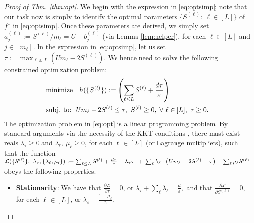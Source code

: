 \begin{proof}[Proof of Thm. \ref{thm:opt}]
	We begin with the expression in \eqref{eq:optsimp}; note that our task now is simply to identify the optimal parameters $\{S^{(\ell)}:\ \ell\in [L]\}$ of $f^\star$ in \eqref{eq:optsimp}. Once these parameters are derived, we simply set $a_j^{(\ell)}:= S^{(\ell)}/m_\ell = U-b_j^{(\ell)}$ (via Lemma \ref{lem:helper}), for each $\ell\in [L]$ and $j\in [m_\ell]$. In the expression in \eqref{eq:optsimp}, let us set $\tau:= \max_{\ell\leq L} \left(Um_\ell - 2S^{(\ell)}\right)$. We hence need to solve the following constrained optimization problem:
	\begin{align}
		&{\text{minimize}}\quad h(\{S^{(\ell)}\}):= \left(\sum_{\ell\leq L} S^{(\ell)}+\frac{d\tau}{\varepsilon}\right)\notag\\
		&\text{subj. to:}\ \  Um_\ell-2S^{(\ell)}\leq \tau,\ S^{(\ell)}\geq 0,\ \forall\ \ell\in [L],\ \tau\geq 0.\label{eq:opt}
	\end{align}
The optimization problem in \eqref{eq:opt} is a linear programming problem. By standard arguments via the necessity of the KKT conditions \cite[Sec. 5.5.3]{boyd}, there must exist reals $\lambda_\tau\geq 0$ and $\lambda_\ell,\ \mu_\ell\geq 0$, for each $\ell\in [L]$ (or Lagrange multipliers), such that the function $\mathcal{L}(\{S^{(\ell)}\},\ \lambda_\tau,\{\lambda_\ell,\mu_\ell\}):= \sum_{\ell\leq L} S^{(\ell)}+\frac{d\tau}{\varepsilon}-\lambda_\tau \tau\ + \\
\sum_\ell \lambda_\ell\cdot \left(Um_\ell-2S^{(\ell)}-\tau\right)-\sum_\ell \mu_\ell S^{(\ell)}$
obeys the following properties.
\begin{itemize}
	\item \textbf{Stationarity}: We have that $\frac{\partial \mathcal{L}}{\partial \tau} = 0$, or $\lambda_\tau+\sum_\ell \lambda_\ell = \frac{d}{\varepsilon},$
and that $\frac{\partial \mathcal{L}}{\partial S^{(\ell)}} = 0$, for each $\ell\in [L]$, or $\lambda_\ell = \frac{1-\mu_\ell}{2}.$

\end{itemize}
\end{proof}
